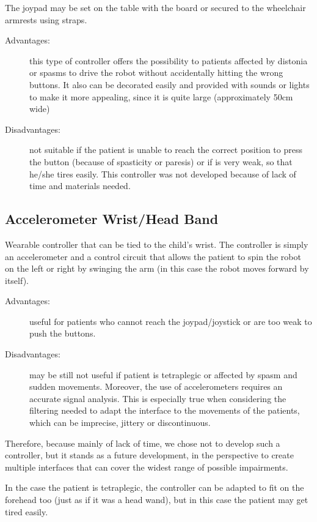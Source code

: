\documentclass[a4paper,twoside]{book}
\begin{document}
\beforelist* The joypad may be set on the table with the board or secured to the wheelchair armrests using straps.
\begin{description}
\item[Advantages:] this type of controller offers the possibility to patients affected by distonia or spasms to drive the robot without accidentally hitting the wrong buttons. It also can be decorated easily and provided with sounds or lights to make it more appealing, since it is quite large (approximately 50cm wide)
\item[Disadvantages:] not suitable if the patient is unable to reach the correct position to press the button (because of spasticity or paresis) or if is very weak, so that he/she tires easily.
This controller was not developed because of lack of time and materials needed.
\end{description}
\afterlist*

\subsection{Accelerometer Wrist/Head Band}
\label{ssec:accel}
\beforelist* Wearable controller that can be tied to the child's wrist. The controller is simply an accelerometer and a control circuit that allows the patient to spin the robot on the left or right by swinging the arm (in this case the robot moves forward by itself).
\begin{description}
\item[Advantages:] useful for patients who cannot reach the joypad/joystick or are too weak to push the buttons.
\item[Disadvantages:] may be still not useful if patient is tetraplegic or affected by spasm and sudden movements. Moreover, the use of accelerometers requires an accurate signal analysis. This is especially true when considering the filtering needed to adapt the interface to the movements of the patients, which can be imprecise, jittery or discontinuous. 
\end{description}
\afterlist*

Therefore, because mainly of lack of time, we chose not to develop such a controller, but it stands as a future development, in the perspective to create multiple interfaces that can cover the widest range of possible impairments.

In the case the patient is tetraplegic, the controller can be adapted to fit on the forehead too (just as if it was a head wand), but in this case the patient may get tired easily.
\end{document}
